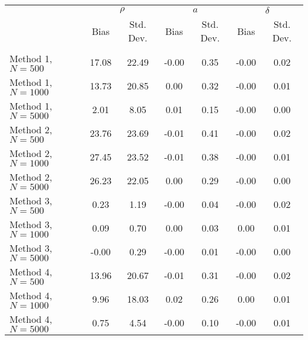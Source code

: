 \begin{tabular}{lcccccc} \\\toprule
 & \multicolumn{2}{c}{$\rho$} & \multicolumn{2}{c}{$a$} & \multicolumn{2}{c}{$\delta$} \\ 
 & Bias & Std. Dev. & Bias & Std. Dev. & Bias & Std. Dev. \\
\cmidrule(r){2-3}\cmidrule(r){4-5}\cmidrule(r){6-7} \\
Method 1, $N=500$ & 17.08 & 22.49 & -0.00 & 0.35 & -0.00 & 0.02\\
Method 1, $N=1000$ & 13.73 & 20.85 & 0.00 & 0.32 & -0.00 & 0.01\\
Method 1, $N=5000$ & 2.01 & 8.05 & 0.01 & 0.15 & -0.00 & 0.00\\
Method 2, $N=500$ & 23.76 & 23.69 & -0.01 & 0.41 & -0.00 & 0.02\\
Method 2, $N=1000$ & 27.45 & 23.52 & -0.01 & 0.38 & -0.00 & 0.01\\
Method 2, $N=5000$ & 26.23 & 22.05 & 0.00 & 0.29 & -0.00 & 0.00\\
Method 3, $N=500$ & 0.23 & 1.19 & -0.00 & 0.04 & -0.00 & 0.02\\
Method 3, $N=1000$ & 0.09 & 0.70 & 0.00 & 0.03 & 0.00 & 0.01\\
Method 3, $N=5000$ & -0.00 & 0.29 & -0.00 & 0.01 & -0.00 & 0.00\\
Method 4, $N=500$ & 13.96 & 20.67 & -0.01 & 0.31 & -0.00 & 0.02\\
Method 4, $N=1000$ & 9.96 & 18.03 & 0.02 & 0.26 & 0.00 & 0.01\\
Method 4, $N=5000$ & 0.75 & 4.54 & -0.00 & 0.10 & -0.00 & 0.01\\
\bottomrule\end{tabular}